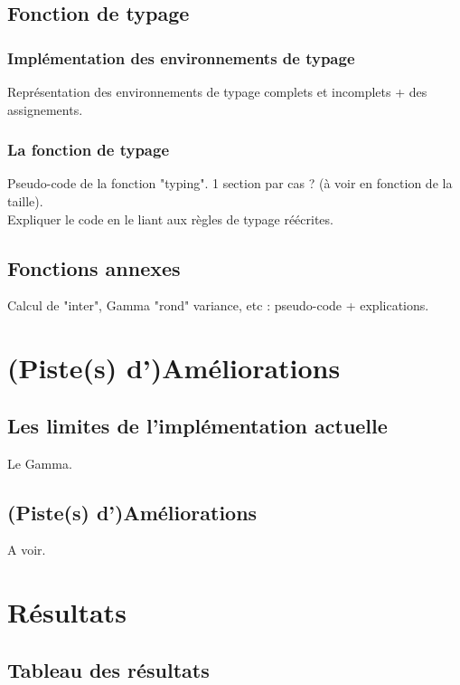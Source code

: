 \documentclass[11pt,a4paper]{article}
\theoremstyle{plain}
\theoremstyle{remark}
\theoremstyle{definition}
\begin{document}
\subsection{Fonction de typage}

\subsubsection{Implémentation des environnements de typage}

Représentation des environnements de typage complets et incomplets + des assignements. 

\subsubsection{La fonction de typage}

Pseudo-code de la fonction "typing". 
1 section par cas ? (à voir en fonction de la taille).
\\
Expliquer le code en le liant aux règles de typage réécrites. 

\subsection{Fonctions annexes}

Calcul de "inter", Gamma "rond" variance, etc : pseudo-code + explications.

\section{(Piste(s) d')Améliorations}

\subsection{Les limites de l'implémentation actuelle}

Le Gamma. 

\subsection{(Piste(s) d')Améliorations}

A voir.

\section{Résultats}

\subsection{Tableau des résultats}
\end{document}
